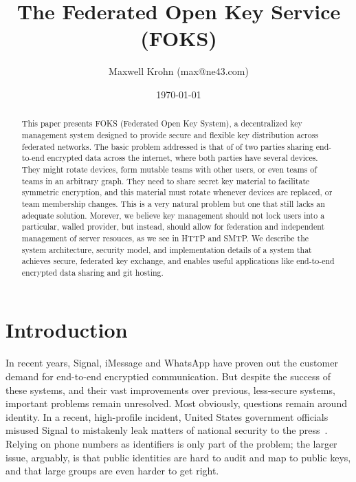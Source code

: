 \documentclass[11pt]{article}
\title{The Federated Open Key Service (FOKS)}
\author{Maxwell Krohn (max@ne43.com)}
\date{\today}
\begin{document}
\newcommand{\yubi}{Yubikey}
\newcommand{\Yubi}{Yubikey}
\newcommand{\yubis}{Yubikeys}
\newcommand{\Yubis}{Yubikeys}

\maketitle

\begin{abstract}

This paper presents FOKS (Federated Open Key System), a
decentralized key management system designed to provide secure and flexible key
distribution across federated networks. The basic problem addressed is that of
of two parties sharing end-to-end encrypted data across the internet, where both
parties have several devices. They might rotate devices, form mutable teams with
other users, or even teams of teams in an arbitrary graph. They need to share
secret key material to facilitate symmetric encryption, and this material must
rotate whenever devices are replaced, or team membership changes.  This is a
very natural problem but one that still lacks an adequate solution.  Morever, we
believe key management should not lock users into a particular, walled provider,
but instead, should allow for federation and independent management of server
resouces, as we see in HTTP and SMTP.  We describe the system architecture,
security model, and implementation details of a system that achieves secure,
federated key exchange, and enables useful applications like end-to-end
encrypted data sharing and git hosting.

\end{abstract}


\section{Introduction}

In recent years, Signal, iMessage and WhatsApp have proven out the customer
demand for end-to-end encryptied communication. But despite the success of these
systems, and their vast improvements over previous, less-secure systems,
important problems remain unresolved.  Most obviously, questions remain around
identity. In a recent, high-profile incident, United States government officials
misused Signal to mistakenly leak matters of national security to the
press~\cite{signal-hesgeth-leak}. Relying on phone numbers as identifiers is
only part of the problem; the larger issue, arguably, is that public identities
are hard to audit and map to public keys, and that large groups are even harder
to get right.
\end{document}

